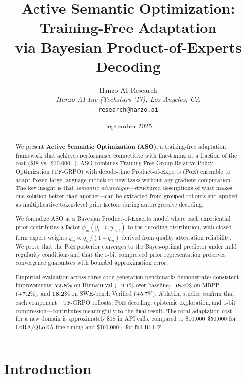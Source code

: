 \documentclass[11pt]{article}
\title{Active Semantic Optimization: Training-Free Adaptation\\via Bayesian Product-of-Experts Decoding}
\author{
    Hanzo AI Research\\
    \textit{Hanzo AI Inc (Techstars '17), Los Angeles, CA}\\
    \texttt{research@hanzo.ai}
}
\date{September 2025}
\begin{document}
\luxcoverpage

\begin{abstract}
We present \textbf{Active Semantic Optimization (ASO)}, a training-free adaptation
framework that achieves performance competitive with fine-tuning at a fraction of
the cost (\$18 vs.\ \$10{,}000+). ASO combines Training-Free Group-Relative Policy
Optimization (TF-GRPO) with decode-time Product-of-Experts (PoE) ensemble to
adapt frozen large language models to new tasks without any gradient computation.
The key insight is that \emph{semantic advantages}---structured descriptions of
what makes one solution better than another---can be extracted from grouped
rollouts and applied as multiplicative token-level prior factors during
autoregressive decoding.

We formalize ASO as a Bayesian Product-of-Experts model where each experiential
prior contributes a factor $\phi_m(y_t \mid x, y_{<t})$ to the decoding
distribution, with closed-form expert weights $\eta_m \propto q_m / (1 - q_m)$
derived from quality attestation reliability. We prove that the PoE posterior
converges to the Bayes-optimal predictor under mild regularity conditions and
that the 1-bit compressed prior representation preserves convergence guarantees
with bounded approximation error.

Empirical evaluation across three code generation benchmarks demonstrates
consistent improvements: \textbf{72.8\%} on HumanEval (+9.1\% over baseline),
\textbf{68.4\%} on MBPP (+7.2\%), and \textbf{18.2\%} on SWE-bench Verified
(+5.7\%). Ablation studies confirm that each component---TF-GRPO rollouts, PoE
decoding, epistemic exploration, and 1-bit compression---contributes
meaningfully to the final result. The total adaptation cost for a new domain is
approximately \$18 in API calls, compared to \$10{,}000--\$50{,}000 for
LoRA/QLoRA fine-tuning and \$100{,}000+ for full RLHF.
\end{abstract}

\section{Introduction}
\label{sec:intro}
\end{document}

